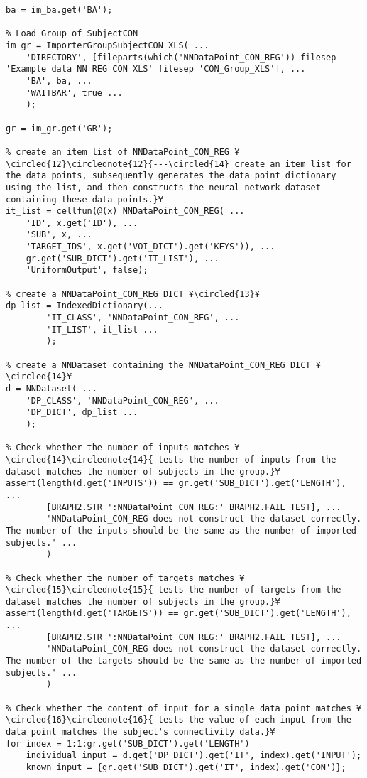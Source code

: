\documentclass{tufte-handout}
\begin{document}
\begin{lstlisting}
ba = im_ba.get('BA');

% Load Group of SubjectCON
im_gr = ImporterGroupSubjectCON_XLS( ...
    'DIRECTORY', [fileparts(which('NNDataPoint_CON_REG')) filesep 'Example data NN REG CON XLS' filesep 'CON_Group_XLS'], ...
    'BA', ba, ...
    'WAITBAR', true ...
    );

gr = im_gr.get('GR');

% create an item list of NNDataPoint_CON_REG ¥\circled{12}\circlednote{12}{---\circled{14} create an item list for the data points, subsequently generates the data point dictionary using the list, and then constructs the neural network dataset containing these data points.}¥
it_list = cellfun(@(x) NNDataPoint_CON_REG( ...
    'ID', x.get('ID'), ...
    'SUB', x, ...
    'TARGET_IDS', x.get('VOI_DICT').get('KEYS')), ...
    gr.get('SUB_DICT').get('IT_LIST'), ...
    'UniformOutput', false);

% create a NNDataPoint_CON_REG DICT ¥\circled{13}¥
dp_list = IndexedDictionary(...
        'IT_CLASS', 'NNDataPoint_CON_REG', ...
        'IT_LIST', it_list ...
        );

% create a NNDataset containing the NNDataPoint_CON_REG DICT ¥\circled{14}¥
d = NNDataset( ...
    'DP_CLASS', 'NNDataPoint_CON_REG', ...
    'DP_DICT', dp_list ...
    );

% Check whether the number of inputs matches ¥\circled{14}\circlednote{14}{ tests the number of inputs from the dataset matches the number of subjects in the group.}¥
assert(length(d.get('INPUTS')) == gr.get('SUB_DICT').get('LENGTH'), ...
		[BRAPH2.STR ':NNDataPoint_CON_REG:' BRAPH2.FAIL_TEST], ...
		'NNDataPoint_CON_REG does not construct the dataset correctly. The number of the inputs should be the same as the number of imported subjects.' ...
		)

% Check whether the number of targets matches ¥\circled{15}\circlednote{15}{ tests the number of targets from the dataset matches the number of subjects in the group.}¥
assert(length(d.get('TARGETS')) == gr.get('SUB_DICT').get('LENGTH'), ...
		[BRAPH2.STR ':NNDataPoint_CON_REG:' BRAPH2.FAIL_TEST], ...
		'NNDataPoint_CON_REG does not construct the dataset correctly. The number of the targets should be the same as the number of imported subjects.' ...
		)

% Check whether the content of input for a single data point matches ¥\circled{16}\circlednote{16}{ tests the value of each input from the data point matches the subject's connectivity data.}¥
for index = 1:1:gr.get('SUB_DICT').get('LENGTH')
    individual_input = d.get('DP_DICT').get('IT', index).get('INPUT');
    known_input = {gr.get('SUB_DICT').get('IT', index).get('CON')};


\end{lstlisting}
\end{document}
